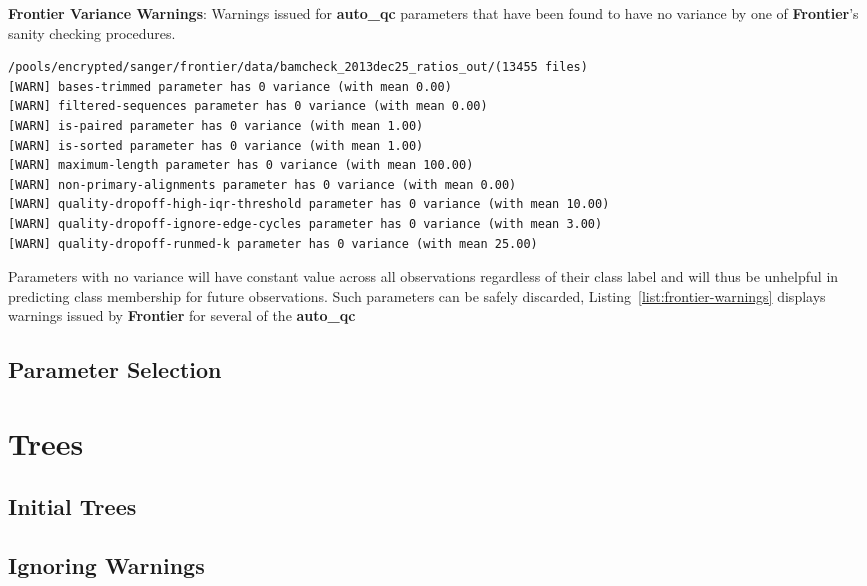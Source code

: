 \begin{listing}[H]
    \caption[frontier-warnings]{\textbf{Frontier Variance Warnings}:
        Warnings issued for \textbf{auto\_qc} parameters that have been found to
        have no variance by one of \textbf{Frontier}'s sanity checking procedures.}
    \label{list:frontier-warnings}
    \begin{verbatim}
/pools/encrypted/sanger/frontier/data/bamcheck_2013dec25_ratios_out/(13455 files)
[WARN] bases-trimmed parameter has 0 variance (with mean 0.00)
[WARN] filtered-sequences parameter has 0 variance (with mean 0.00)
[WARN] is-paired parameter has 0 variance (with mean 1.00)
[WARN] is-sorted parameter has 0 variance (with mean 1.00)
[WARN] maximum-length parameter has 0 variance (with mean 100.00)
[WARN] non-primary-alignments parameter has 0 variance (with mean 0.00)
[WARN] quality-dropoff-high-iqr-threshold parameter has 0 variance (with mean 10.00)
[WARN] quality-dropoff-ignore-edge-cycles parameter has 0 variance (with mean 3.00)
[WARN] quality-dropoff-runmed-k parameter has 0 variance (with mean 25.00)
    \end{verbatim}
\end{listing}

Parameters with no variance will have constant value across all observations
regardless of their class label and will thus be unhelpful in predicting class
membership for future observations. Such parameters can be safely discarded,
Listing~\ref{list:frontier-warnings} displays warnings issued by
\textbf{Frontier} for several of the \textbf{auto\_qc}
\subsection{Parameter Selection}

\section{Trees}
\subsection{Initial Trees}

\subsection{Ignoring Warnings}

